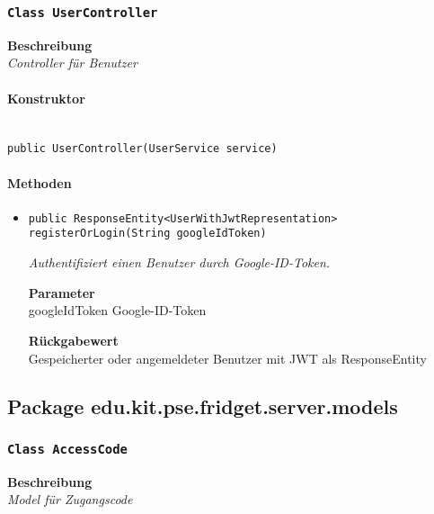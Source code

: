      \subsubsection{\texttt{Class UserController}}
     \textbf{Beschreibung} \\
     \textit{Controller für Benutzer}
     \paragraph*{Konstruktor}\mbox{} \\
     \texttt{public UserController(UserService service)} \\
     \paragraph*{Methoden}
     \begin{itemize}
     	\item{\texttt{public ResponseEntity<UserWithJwtRepresentation> registerOrLogin(String googleIdToken)}}
     	
     	\textit{Authentifiziert einen Benutzer durch Google-ID-Token.}
     	
     	\textbf{Parameter} \\
     	googleIdToken Google-ID-Token
     	
     	\textbf{Rückgabewert} \\
     	Gespeicherter oder angemeldeter Benutzer mit JWT als ResponseEntity
     \end{itemize}
     \subsection{Package edu.kit.pse.fridget.server.models}
     \subsubsection{\texttt{Class AccessCode}}
     \textbf{Beschreibung} \\
     \textit{Model für Zugangscode}
